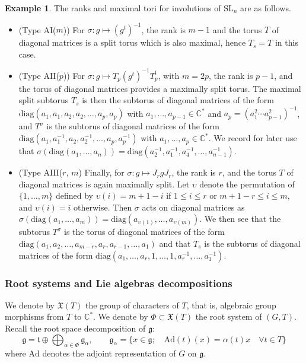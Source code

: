 \documentclass{amsart}
\theoremstyle{definition}
\newtheorem{exa}[thm]{Example}
\begin{document}
\begin{exa}
\label{exa_max_tori}
The ranks and maximal tori for involutions of $\mathrm{SL}_n$ 
are as follows.
\begin{itemize}
\item (Type AI($m$)) For $\sigma:g\mapsto (g^t)^{-1}$, the rank is $m-1$ and the torus 
$T$ of diagonal matrices is a split torus which is also maximal, hence $T_s=T$ in 
this case.
\item (Type AII($p$)) For $\sigma:g\mapsto T_p(g^t)^{-1}T_p^t$, with $m=2p$, the rank 
is $p-1$, and the torus of diagonal matrices provides a maximally split torus. 
The maximal split subtorus $T_s$ is then the subtorus of diagonal matrices of the form 
$\mathrm{diag}(a_1,a_1,a_2,a_2,\ldots,a_p,a_p)$ with $a_1,\ldots,a_{p-1}\in \mathbb{C}^*$
and $a_p=(a_1^2\cdots a_{p-1}^2)^{-1}$, and $T^{\sigma}$ is the subtorus of diagonal 
matrices of the form $\mathrm{diag}(a_1,a_1^{-1},a_2,a_2^{-1},\ldots,a_p,a_p^{-1})$
with $a_1,\ldots,a_p\in \mathbb{C}^*$. 
We record for later use that 
$\sigma(\mathrm{diag}(a_1,\ldots,a_n))=\mathrm{diag}(a_2^{-1},a_1^{-1},a_4^{-1},\ldots,a_{n-1}^{-1})$.
\item (Type AIII($r$, $m$) Finally, for $\sigma:g\mapsto J_rgJ_r$, the rank 
is $r$, and the torus $T$ of diagonal matrices is again maximally split. 
Let $\upsilon$ denote the permutation of $\{1,\ldots ,m\}$ defined by 
$\upsilon(i)=m+1-i$ if $1\leq i\leq r$ or $m+1-r\leq i\leq m$, and $\upsilon(i)=i$ 
otherwise. Then $\sigma$ acts on diagonal matrices as 
$\sigma(\mathrm{diag}(a_1,\ldots,a_m))=\mathrm{diag}(a_{\upsilon(1)},\ldots,a_{\upsilon(m)})$.
We then see that the subtorus $T^{\sigma}$ is the torus of diagonal matrices 
of the form 
$\mathrm{diag}(a_1,a_2,\ldots,a_{m-r},a_r,a_{r-1},\ldots,a_1)$
and that $T_s$ is the subtorus of diagonal matrices of the form 
$\mathrm{diag}(a_1,\ldots,a_{r},1,\ldots,1,a_r^{-1},\ldots,a_1^{-1})$.
\end{itemize}
\end{exa}

\subsubsection{Root systems and Lie algebras decompositions}

We denote by $\mathfrak{X}(T)$ the group of characters of $T$, that is, 
algebraic group morphisms from $T$ to $\mathbb{C}^*$. 
We denote by $\Phi\subset \mathfrak{X}(T)$ the root system of $(G,T)$. 
Recall the root space decomposition of $\mathfrak{g}$:
\[
\mathfrak{g} = \mathfrak{t} \oplus \bigoplus_{\alpha \in \Phi} \mathfrak{g}_{\alpha},
\qquad
\mathfrak{g}_{\alpha} = \{x\in \mathfrak{g} ; \quad 
\mathrm{Ad}(t)(x) = \alpha(t)x \quad \forall t\in T \}
\]
where $\mathrm{Ad}$ denotes the adjoint representation of $G$ on $\mathfrak{g}$. 
\end{document}
